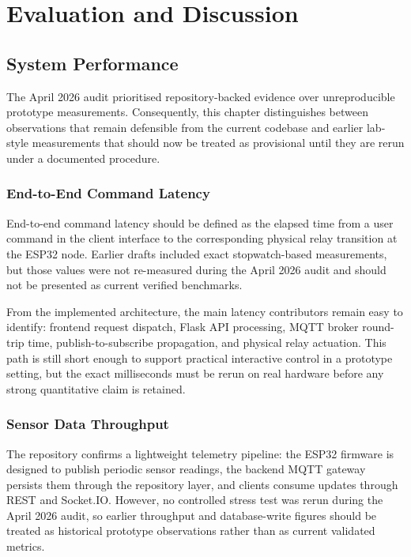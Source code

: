 \chapter{Evaluation and Discussion}

\section{System Performance}

The April 2026 audit prioritised repository-backed evidence over unreproducible
prototype measurements. Consequently, this chapter distinguishes between
observations that remain defensible from the current codebase and earlier
lab-style measurements that should now be treated as provisional until they are
rerun under a documented procedure.

\subsection{End-to-End Command Latency}

End-to-end command latency should be defined as the elapsed time from a user
command in the client interface to the corresponding physical relay transition
at the ESP32 node. Earlier drafts included exact stopwatch-based measurements,
but those values were not re-measured during the April 2026 audit and should
not be presented as current verified benchmarks.

From the implemented architecture, the main latency contributors remain easy to
identify: frontend request dispatch, Flask API processing, MQTT broker
round-trip time, publish-to-subscribe propagation, and physical relay actuation.
This path is still short enough to support practical interactive control in a
prototype setting, but the exact milliseconds must be rerun on real hardware
before any strong quantitative claim is retained.

\subsection{Sensor Data Throughput}

The repository confirms a lightweight telemetry pipeline: the ESP32 firmware is
designed to publish periodic sensor readings, the backend MQTT gateway persists
them through the repository layer, and clients consume updates through REST and
Socket.IO. However, no controlled stress test was rerun during the April 2026
audit, so earlier throughput and database-write figures should be treated as
historical prototype observations rather than as current validated metrics.

